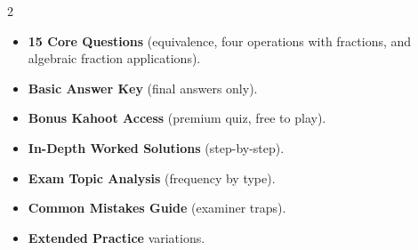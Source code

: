 \documentclass[11pt,a4paper]{article}
\newcommand{\FullReleaseDate}{April 30, 2026}
\begin{document}
\vspace{8pt}

\begin{multicols}{2}
  \begin{tcolorbox}[card, title=\sffamily\bfseries\textcolor{white}{\faHandPointDown\ TODAY (Simplified Version)}, colbacktitle=mainblue, boxed title style={sharp corners, boxrule=0pt}]
    \begin{itemize}[leftmargin=1.2em, itemsep=2pt]
      \item \small \textbf{15 Core Questions} (equivalence, four operations with fractions, and algebraic fraction applications).
      \item \small \textbf{Basic Answer Key} (final answers only).
      \item \small \textbf{Bonus Kahoot Access} (premium quiz, free to play).
    \end{itemize}
  \end{tcolorbox}

  \columnbreak

  \begin{tcolorbox}[card, title=\sffamily\bfseries\textcolor{white}{\faRocket\ ON \FullReleaseDate\ (Full Upgrade)}, colbacktitle=mainblue, boxed title style={sharp corners, boxrule=0pt}]
    \begin{itemize}[leftmargin=1.2em, itemsep=2pt]
      \item \small \textbf{In-Depth Worked Solutions} (step-by-step).
      \item \small \textbf{Exam Topic Analysis} (frequency by type).
      \item \small \textbf{Common Mistakes Guide} (examiner traps).
      \item \small \textbf{Extended Practice} variations.
    \end{itemize}
  \end{tcolorbox}
\end{multicols}
\end{document}
